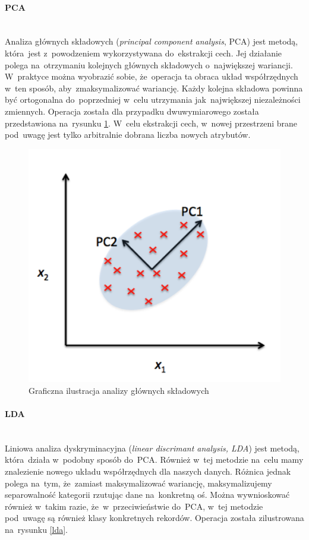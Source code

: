 \paragraph{PCA}\mbox{}\\
Analiza głównych składowych (\textit{principal component analysis}, PCA) jest metodą, która~jest z~powodzeniem wykorzystywana do~ekstrakcji cech. Jej działanie polega na~otrzymaniu kolejnych głównych składowych o~największej wariancji. W~praktyce można wyobrazić sobie, że~operacja ta obraca układ współrzędnych w~ten sposób, aby~zmaksymalizować wariancję. Każdy kolejna składowa powinna być ortogonalna do~poprzedniej w~celu utrzymania jak~największej niezależności zmiennych. Operacja została dla przypadku dwuwymiarowego została przedstawiona na~rysunku \ref{pca}. W~celu ekstrakcji cech, w~nowej przestrzeni brane pod~uwagę jest tylko arbitralnie dobrana liczba nowych atrybutów.
\begin{figure}[ht!]
\centering
\includegraphics[scale=0.5]{res/pca.png}
\caption[Caption for LOF]{Graficzna ilustracja analizy głównych składowych\footnotemark} \label{pca} 
\end{figure}

\paragraph{LDA}\mbox{}\\
Liniowa analiza dyskryminacyjna (\textit{linear discrimant analysis, LDA}) jest metodą, która~działa w~podobny sposób do~PCA. Również w~tej metodzie na~celu mamy znalezienie nowego układu współrzędnych dla naszych danych. Różnica jednak polega na~tym, że~zamiast maksymalizować wariancję, maksymalizujemy separowalność kategorii rzutując dane na~konkretną oś. Można wywnioskować również w~takim razie, że~w~przeciwieństwie do~PCA, w~tej metodzie pod~uwagę są również klasy konkretnych rekordów. Operacja została zilustrowana na~rysunku \ref{lda}. 

